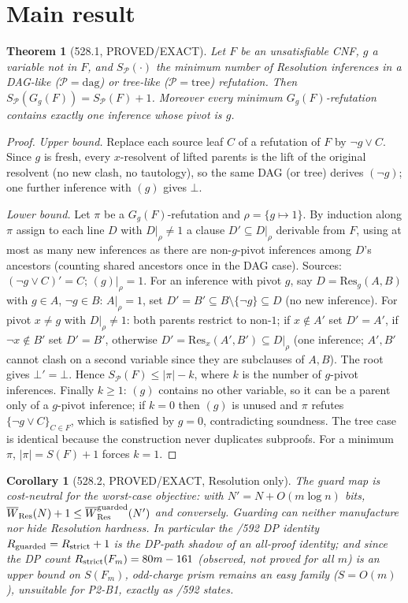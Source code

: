 \documentclass[11pt]{article}
\newtheorem{theorem}{Theorem}
\newtheorem{corollary}{Corollary}
\begin{document}
\section*{Main result}
\begin{theorem}[528.1, PROVED/EXACT]
Let $F$ be an unsatisfiable CNF, $g$ a variable not in $F$, and $S_{\mathcal P}(\cdot)$ the minimum number of
Resolution inferences in a DAG-like ($\mathcal P=\mathrm{dag}$) or tree-like ($\mathcal P=\mathrm{tree}$) refutation.
Then $S_{\mathcal P}(G_g(F))=S_{\mathcal P}(F)+1$. Moreover every minimum $G_g(F)$-refutation contains exactly one
inference whose pivot is $g$.
\end{theorem}
\begin{proof}
\emph{Upper bound.} Replace each source leaf $C$ of a refutation of $F$ by $\neg g\vee C$. Since $g$ is fresh, every
$x$-resolvent of lifted parents is the lift of the original resolvent (no new clash, no tautology), so the same DAG
(or tree) derives $(\neg g)$; one further inference with $(g)$ gives $\bot$.

\emph{Lower bound.} Let $\pi$ be a $G_g(F)$-refutation and $\rho=\{g\mapsto1\}$. By induction along $\pi$ assign to
each line $D$ with $D|_\rho\neq1$ a clause $D'\subseteq D|_\rho$ derivable from $F$, using at most as many new
inferences as there are non-$g$-pivot inferences among $D$'s ancestors (counting shared ancestors once in the DAG
case). Sources: $(\neg g\vee C)'=C$; $(g)|_\rho=1$. For an inference with pivot $g$, say $D=\mathrm{Res}_g(A,B)$
with $g\in A$, $\neg g\in B$: $A|_\rho=1$, set $D'=B'\subseteq B\setminus\{\neg g\}\subseteq D$ (no new inference).
For pivot $x\neq g$ with $D|_\rho\neq1$: both parents restrict to non-$1$; if $x\notin A'$ set $D'=A'$, if
$\neg x\notin B'$ set $D'=B'$, otherwise $D'=\mathrm{Res}_x(A',B')\subseteq D|_\rho$ (one inference; $A',B'$ cannot
clash on a second variable since they are subclauses of $A,B$). The root gives $\bot'=\bot$. Hence $S_{\mathcal P}(F)\le
|\pi|-k$, where $k$ is the number of $g$-pivot inferences. Finally $k\ge1$: $(g)$ contains no other variable, so it
can be a parent only of a $g$-pivot inference; if $k=0$ then $(g)$ is unused and $\pi$ refutes
$\{\neg g\vee C\}_{C\in F}$, which is satisfied by $g=0$, contradicting soundness. The tree case is identical because
the construction never duplicates subproofs. For a minimum $\pi$, $|\pi|=S(F)+1$ forces $k=1$.
\end{proof}

\begin{corollary}[528.2, PROVED/EXACT, Resolution only]
The guard map is cost-neutral for the worst-case objective: with $N'=N+O(m\log n)$ bits,
$\overline W_{\mathrm{Res}}(N)+1\le\overline W_{\mathrm{Res}}^{\rm guarded}(N')$ and conversely. Guarding can neither
manufacture nor hide Resolution hardness. In particular the /592 DP identity
$R_{\rm guarded}=R_{\rm strict}+1$ is the DP-path shadow of an all-proof identity; and since the DP count
$R_{\rm strict}(F_m)=80m-161$ (observed, not proved for all $m$) is an \emph{upper} bound on $S(F_m)$, odd-charge prism
remains an easy family ($S=O(m)$), unsuitable for P2-B1, exactly as /592 states.
\end{corollary}
\end{document}
